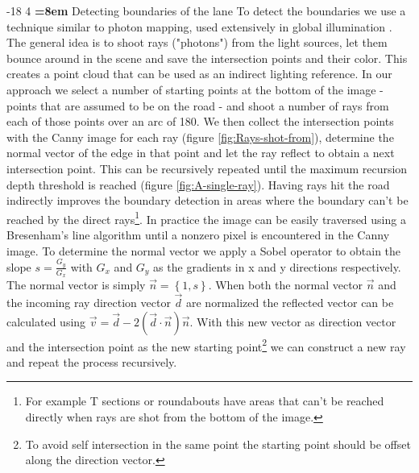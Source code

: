\documentclass[oneside,english]{llncs}
\makeatletter
\renewcommand\subsubsection{\@startsection{subsubsection}{3}{\z@}%
                       {-18\p@ \@plus -4\p@ \@minus -4\p@}%
                       {4\p@ \@plus 2\p@ \@minus 2\p@}%
                       {\normalfont\normalsize\bfseries\boldmath
                        \rightskip=\z@ \@plus 8em\pretolerance=10000 }}
\makeatother
\begin{document}
\subsubsection{Detecting boundaries of the lane}
To detect the boundaries we use a technique similar to photon mapping, used extensively in global illumination \cite{key-4}. The general idea is to shoot rays ("photons") from the light sources, let them bounce around in the scene and save the intersection points and their color. This creates a point cloud that can be used as an indirect lighting reference. In our approach we select a number of starting points at the bottom of the image - points that are assumed to be on the road - and shoot a number of rays from each of those points over an arc of 180\degree. We then collect the intersection points with the Canny image for each ray (figure \ref{fig:Rays-shot-from}), determine the normal vector of the edge in that point and let the ray reflect to obtain a next intersection point. This can be recursively repeated until the maximum recursion depth threshold is reached (figure \ref{fig:A-single-ray}).
Having rays hit the road indirectly improves the boundary detection in areas where the boundary can't be reached by the direct rays\footnote{For example T sections or roundabouts have areas that can't be reached directly when rays are shot from the bottom of the image.}. In practice the image can be easily traversed using a Bresenham's line algorithm \cite{key-2} until a nonzero pixel is encountered in the Canny image. To determine the normal vector we apply a Sobel operator to obtain the slope $s=\frac{G_{y}}{G_{x}}$ with $G_{x}$ and $G_{y}$ as the gradients in x and y directions respectively. 
The normal vector is simply $\overrightarrow{n}=\left\{ 1,s\right\} $. When both the normal vector $\overrightarrow{n}$ and the incoming ray direction vector $\overrightarrow{d}$ are normalized the reflected vector can be calculated using $\overrightarrow{v}=\overrightarrow{d}-2(\overrightarrow{d}\cdot\overrightarrow{n})\overrightarrow{n}$.
With this new vector as direction vector and the intersection point as the new starting point\footnote{To avoid self intersection in the same point the starting point should be offset along the direction vector.} we can construct a new ray and repeat the process recursively.
\end{document}
